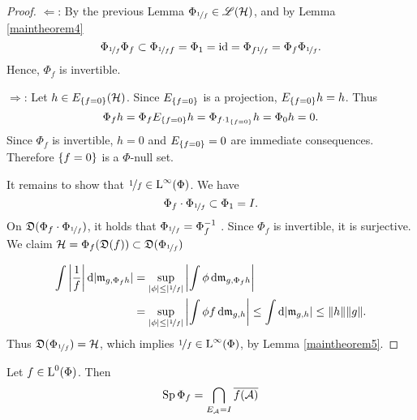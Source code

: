 \begin{proof}
 $\Leftarrow$: 
 By the previous Lemma $\Phi_{\nicefrac{1}{f}} \in \mathscr{L}(\mathcal{H})$, and by Lemma 
 \ref{maintheorem4}
 \[
 \Phi_{\nicefrac{1}{f}} \Phi_f \subset \Phi_{\nicefrac{1}{f} f} = \Phi_1 = \operatorname{id} =
 \Phi_{f \nicefrac{1}{f}} = \Phi_f \Phi_{\nicefrac{1}{f}}.
 \]
Hence, $\Phi_f$ is invertible.

$\Rightarrow$:
Let $h \in E_{\left\lbrace f = 0\right\rbrace}(\mathcal{H})$. Since $E_{\left\lbrace f = 0\right\rbrace}$ is a
projection, $E_{\left\lbrace f = 0\right\rbrace} h = h$. Thus
\[
  \Phi_f h = \Phi_f E_{\left\lbrace f = 0\right\rbrace} h = \Phi_{f \cdot 
    1_{\left\lbrace f = 0\right\rbrace}} h = \Phi_0 h = 0.
\]
Since $\Phi_f $ is invertible, $h =0$ and $E_{\left\lbrace f = 0\right\rbrace} =0$ are
immediate consequences. Therefore $\left\lbrace f = 0\right\rbrace$ is a $\Phi$-null set. 

It remains to show that $ \nicefrac{1}{f} \in {\text{L}^\infty }(\Phi)$. We have
\[
\Phi_f \cdot \Phi_{\nicefrac{1}{f}} \subset \Phi_1 = I.
\]
On $\mathfrak{D}(\Phi_f \cdot \Phi_{\nicefrac{1}{f}}) $, it holds that 
$\Phi_{\nicefrac{1}{f}}= \Phi_f ^{-1}$ .
Since $\Phi_f$ is invertible, it is surjective. We claim $ \mathcal{H} = \Phi_f(\mathfrak{D}(f))
\subset \mathfrak{D}(\Phi_{\nicefrac{1}{f}})$

\begin{align*}
  \int \left| \frac{1}{f} \right | \text{d}|\mathfrak{m}_{g,\Phi_f h}| &= \sup_{| \phi |
    \leq \left | \nicefrac{1}{f} \right| } \left | \int \phi \operatorname{d}\! \mathfrak{m}_{g,\Phi_f h}
  \right| \\&= \sup_{| \phi | \leq \left| \nicefrac{1}{f} \right |}
  \left| \int \phi f \operatorname{d}\! \mathfrak{m}_{g,h} \right| \leq \int \text{d}|\mathfrak{m}_{g,h}| \leq
  \| h \| \|g\|.
\end{align*}
Thus $\mathfrak{D}(\Phi_{\nicefrac{1}{f}}) = \mathcal{H}$, which implies $\nicefrac{1}{f}
\in {\text{L}^\infty }(\Phi)$,
by Lemma \ref{maintheorem5}.
\end{proof}

\begin{lem} \label{maintheorem7}
 Let $f \in {\text{L}^0}(\Phi)$. Then 
 \[
 \operatorname{Sp} \Phi_f = \bigcap_{E_\mathcal{A} = I} \overline{f(\mathcal{A})}
 \]

\end{lem}

